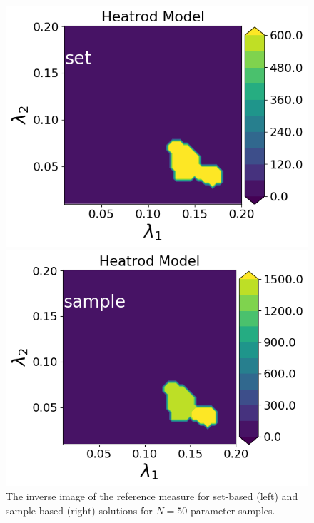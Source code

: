 \begin{figure}[h]
\begin{minipage}{.475\textwidth}
\includegraphics[width=\linewidth]{examples/fig_heatrod_q1/HeatrodModel--set_N50_em.png}
\end{minipage}
\begin{minipage}{.475\textwidth}
\includegraphics[width=\linewidth]{examples/fig_heatrod_q1/HeatrodModel--sample_N50_mc.png}
\end{minipage}
\caption{The inverse image of the reference measure for set-based (left) and sample-based (right) solutions for $N=50$ parameter samples.}
\label{fig:heatrod-sol-ex}
\end{figure}
